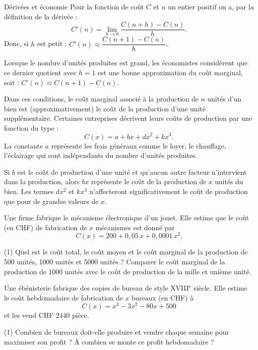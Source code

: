\documentclass[a4paper,12pt]{article}
\begin{document}
\begin{activite}{Dérivées et économie}
Pour la fonction de coût \(C\) et \(n\) un entier positif on a, par la définition de la dérivée :
\[
  C'(n)=\displaystyle\lim_{h\to0}\dfrac{C(n+h)-C(n)}{h}.
\]
Donc, si \(h\) est petit : \(C'(n)\approx\dfrac{C(n+1)-C(n)}{h}\).

Lorsque le nombre d’unités produites est grand, les économistes considèrent que ce dernier quotient avec \(h=1\) est une bonne approximation du coût marginal, soit : \(C'(n)\approx C(n+1)-C(n)\).

Dans ces conditions, le coût marginal associé à la production de \(n\) unités d’un bien est (approximativement) le coût de la production d’une unité supplémentaire. Certaines entreprises décrivent leurs coûts de production par une fonction du type : 
\[
  C(x)=a + bx + dx^2 + kx^3.
\]
La constante \(a\) représente les frais généraux comme le loyer, le chauffage, l’éclairage qui sont indépendants du nombre d’unités produites.

Si \(b\) est le coût de production d’une unité et qu’aucun autre facteur n’intervient dans la production, alors \(bx\) représente le coût de la production de \(x\) unités du bien. Les termes \(dx^2\) et \(kx^3\) n’affecteront significativement le coût de production que pour de grandes valeurs de \(x\).

Une firme fabrique le mécanisme électronique d’un jouet. Elle estime que le coût (en CHF) de fabrication de \(x\) mécanismes est donné par
\[
  C(x)=200 + 0,05\,x + 0,0001\,x^2.
\]

\begin{tasks}(1)
	\task[d)] Quel est le coût total, le coût moyen et le coût marginal de la production de 500 unités, 1000 unités et 5000 unités ?
	\task[e)]  Comparer le coût marginal de la production de 1000 unités avec le coût de production de la mille et unième unité.
\end{tasks}

Une ébénisterie fabrique des copies de bureau de style XVIII$^\text{e}$ siècle. Elle estime le coût hebdomadaire de fabrication de \(x\) bureaux (en CHF) à 
\[
  C(x)=x^3 -3x^2 -80x +500
\]
et les vend CHF $2440$ pièce.

\begin{tasks}(1)
	\task[f)] Combien de bureaux doit-elle produire et vendre chaque semaine pour maximiser son profit ?
	\task[g)] À combien se monte ce profit hebdomadaire ?
\end{tasks}


\end{activite}
\end{document}
